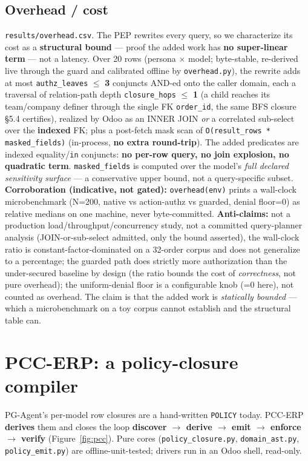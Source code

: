 \documentclass[11pt,a4paper]{article}
\newcommand{\code}[1]{\texttt{#1}}
\begin{document}
\subsection{Overhead / cost}
\code{results/overhead.csv}. The PEP rewrites every query, so we characterize its cost as a \textbf{structural
bound} --- proof the added work has \textbf{no super-linear term} --- not a latency. Over 20 rows (persona
$\times$ model; byte-stable, re-derived live through the guard and calibrated offline by \code{overhead.py}), the
rewrite adds at most \code{authz\_leaves} $\le$ \textbf{3} conjuncts AND-ed onto the caller domain, each a
traversal of relation-path depth \code{closure\_hops} $\le$ \textbf{1} (a child reaches its team/company definer
through the single FK \code{order\_id}, the same BFS closure \S5.4 certifies), realized by Odoo as an INNER JOIN
\emph{or} a correlated sub-select over the \textbf{indexed} FK; plus a post-fetch mask scan of
\code{O(result\_rows * masked\_fields)} (in-process, \textbf{no extra round-trip}). The added predicates are
indexed equality/\code{in} conjuncts: \textbf{no per-row query, no join explosion, no quadratic term}.
\code{masked\_fields} is computed over the model's \emph{full declared sensitivity surface} --- a conservative
upper bound, not a query-specific subset. \textbf{Corroboration (indicative, not gated):} \code{overhead(env)}
prints a wall-clock microbenchmark (N=200, native vs action-authz vs guarded, denial floor=0) as relative medians
on one machine, never byte-committed. \textbf{Anti-claims:} not a production load/throughput/concurrency study,
not a committed query-planner analysis (JOIN-or-sub-select admitted, only the bound asserted), the wall-clock
ratio is constant-factor-dominated on a 32-order corpus and does not generalize to a percentage; the guarded path
does strictly more authorization than the under-secured baseline by design (the ratio bounds the cost of
\emph{correctness}, not pure overhead); the uniform-denial floor is a configurable knob (=0 here), not counted as
overhead. The claim is that the added work is \emph{statically bounded} --- which a microbenchmark on a toy corpus
cannot establish and the structural table can.

\section{PCC-ERP: a policy-closure compiler}
PG-Agent's per-model row closures are a hand-written \code{POLICY} today. PCC-ERP \textbf{derives} them and
closes the loop \textbf{discover $\to$ derive $\to$ emit $\to$ enforce $\to$ verify} (Figure~\ref{fig:pcc}). Pure
cores (\code{policy_closure.py}, \code{domain_ast.py}, \code{policy_emit.py}) are offline-unit-tested; drivers run
in an Odoo shell, read-only.
\end{document}
